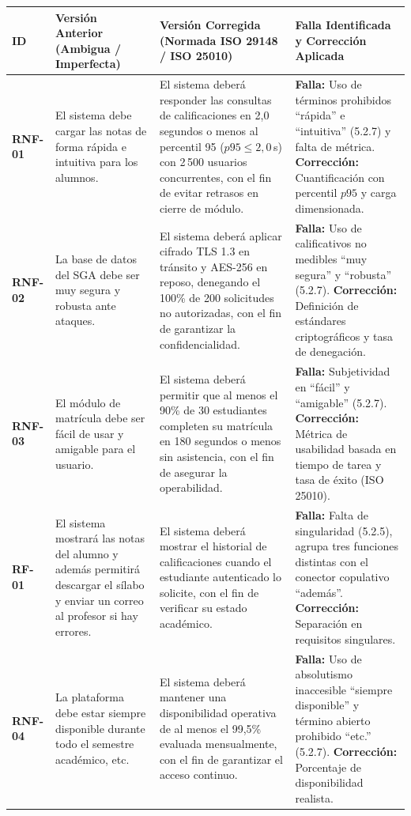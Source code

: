 \documentclass[conference]{IEEEtran}
\begin{document}
	\vspace{0.2cm}
	{\centering
		\scriptsize
		\setlength{\tabcolsep}{2.5pt}
		\noindent\begin{tabularx}{\textwidth}{@{}p{0.8cm} Y Y p{3.0cm}@{}}
			\toprule
			\textbf{ID} & \textbf{Versión Anterior (Ambigua / Imperfecta)} & \textbf{Versión Corregida (Normada ISO 29148 / ISO 25010)} & \textbf{Falla Identificada y Corrección Aplicada}\\
			\midrule
			\textbf{RNF-01} & El sistema debe cargar las notas de forma rápida e intuitiva para los alumnos. & El sistema deberá responder las consultas de calificaciones en 2,0 segundos o menos al percentil 95 ($p95 \le 2{,}0$\,s) con 2\,500 usuarios concurrentes, con el fin de evitar retrasos en cierre de módulo. & \textbf{Falla:} Uso de términos prohibidos ``rápida'' e ``intuitiva'' (5.2.7) y falta de métrica. \textbf{Corrección:} Cuantificación con percentil $p95$ y carga dimensionada.\\
			\addlinespace
			\textbf{RNF-02} & La base de datos del SGA debe ser muy segura y robusta ante ataques. & El sistema deberá aplicar cifrado TLS 1.3 en tránsito y AES-256 en reposo, denegando el 100\% de 200 solicitudes no autorizadas, con el fin de garantizar la confidencialidad. & \textbf{Falla:} Uso de calificativos no medibles ``muy segura'' y ``robusta'' (5.2.7). \textbf{Corrección:} Definición de estándares criptográficos y tasa de denegación.\\
			\addlinespace
			\textbf{RNF-03} & El módulo de matrícula debe ser fácil de usar y amigable para el usuario. & El sistema deberá permitir que al menos el 90\% de 30 estudiantes completen su matrícula en 180 segundos o menos sin asistencia, con el fin de asegurar la operabilidad. & \textbf{Falla:} Subjetividad en ``fácil'' y ``amigable'' (5.2.7). \textbf{Corrección:} Métrica de usabilidad basada en tiempo de tarea y tasa de éxito (ISO 25010).\\
			\addlinespace
			\textbf{RF-01} & El sistema mostrará las notas del alumno y además permitirá descargar el sílabo y enviar un correo al profesor si hay errores. & El sistema deberá mostrar el historial de calificaciones cuando el estudiante autenticado lo solicite, con el fin de verificar su estado académico. & \textbf{Falla:} Falta de singularidad (5.2.5), agrupa tres funciones distintas con el conector copulativo ``además''. \textbf{Corrección:} Separación en requisitos singulares.\\
			\addlinespace
			\textbf{RNF-04} & La plataforma debe estar siempre disponible durante todo el semestre académico, etc. & El sistema deberá mantener una disponibilidad operativa de al menos el 99,5\% evaluada mensualmente, con el fin de garantizar el acceso continuo. & \textbf{Falla:} Uso de absolutismo inaccesible ``siempre disponible'' y término abierto prohibido ``etc.'' (5.2.7). \textbf{Corrección:} Porcentaje de disponibilidad realista.\\
			\bottomrule
		\end{tabularx}\par}
	\vspace{0.2cm}
	
\end{document}
